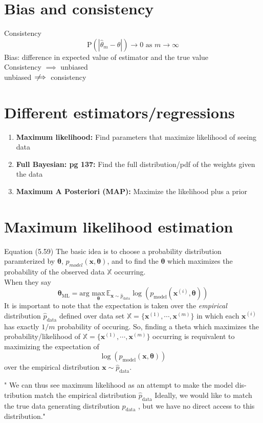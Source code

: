 \documentclass{article}
\newcommand{\beq}{\begin{equation}}
\newcommand{\eeq}{\end{equation}}
\newcommand{\notimplies}{\;\not\!\!\!\implies}
\begin{document}
\section{Bias and consistency}
Consistency
\beq
\text{P}(|\hat{\theta}_m - \theta|) \rightarrow 0 \text{ as } m \rightarrow \infty
\eeq
Bias: difference in expected value of estimator and the true value\\
Consistency $\implies$ unbiased\\
unbiased $\notimplies$ consistency
%
%
\section{Different estimators/regressions}
\begin{enumerate}
\item{\textbf{Maximum likelihood: } Find parameters that maximize likelihood of seeing data}
\item{\textbf{Full Bayesian: pg 137:} Find the full distribution/pdf of the weights given the data}
\item{\textbf{Maximum A Posteriori (MAP):} Maximize the likelihood plus a prior}  
\end{enumerate}
%
%
\section{\label{sect:mle}Maximum likelihood estimation}
Equation (5.59) The basic idea is to choose a probability distribution paramterized by $\pmb{\theta}$, $p_{model}(\pmb{x},\pmb{\theta})$, and to find the $\pmb{\theta}$ which maximizes the probability of the observed data $\mathbb{X}$ occurring.\\
When they say
\beq
\mathbf{\theta}_{\text{ML}} = \text{arg } \underset{\pmb{\theta}}{\text{max}} \, \mathbb{E}_{\mathbf{x}\sim\hat{p}_{\text{data}}}\log(p_{\text{model}}(\pmb{x}^{(i)},\pmb{\theta}))
\eeq
It is important to note that the expectation is taken over the \textit{empirical} distribution $\hat{p}_{\text{data}}$ defined over data set $\mathbb{X}=\{\pmb{x}^{(1)},\cdots,\pmb{x}^{(m)}\}$ in which each $\pmb{x}^{(i)}$ has exactly $1/m$ probability of occuring. So, finding a theta which maximizes the probability/likelihood of $\mathbb{X}=\{\pmb{x}^{(1)},\cdots,\pmb{x}^{(m)}\}$ occurring is requivalent to maximizing the expectation of
\beq
\log(p_{\text{model}}(\pmb{x},\pmb{\theta}))
\eeq
over the empirical distribution $\mathbf{x}\sim\hat{p}_{\text{data}}$.

" We can thus see maximum likelihood as an attempt to make the model dis-
tribution match the empirical distribution $\hat{p}_{\text{data}}$ Ideally, we would like to match
the true data generating distribution $p_{\text{data}}$ , but we have no direct access to this
distribution."
\end{document}
